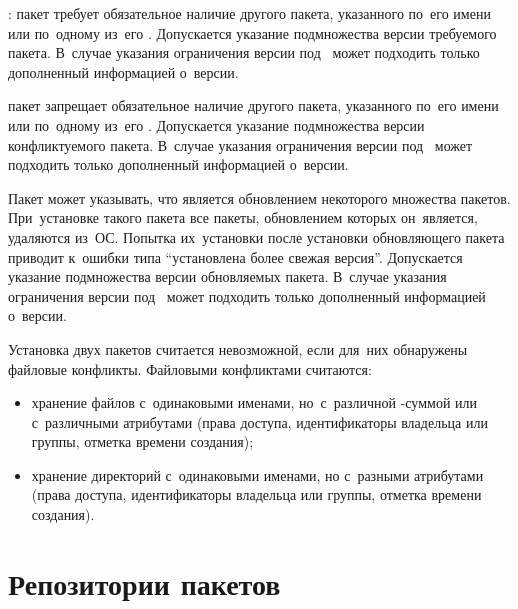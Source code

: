\begin{description}

\item{:}
пакет требует обязательное наличие другого пакета, указанного по~его имени или по~одному из~его .
Допускается указание подмножества версии требуемого пакета.
В~случае указания ограничения версии под~ может подходить  только дополненный информацией о~версии.

\item[\EN{Conflicts}:]
пакет запрещает обязательное наличие другого пакета, указанного по~его имени или по~одному из~его .
Допускается указание подмножества версии конфликтуемого пакета.
В~случае указания ограничения версии под~ может подходить  только дополненный информацией о~версии.

\item[\EN{Obsoletes}:]
Пакет может указывать, что является обновлением некоторого множества пакетов.
При~установке такого пакета все пакеты, обновлением которых он~является, удаляются из~ОС.
Попытка их~установки после установки обновляющего пакета приводит к~ошибки типа ``установлена более свежая версия''.
Допускается указание подмножества версии обновляемых пакета.
В~случае указания ограничения версии под~ может подходить  только дополненный информацией о~версии.

\end{description}

Установка двух пакетов считается невозможной, если для~них обнаружены файловые конфликты.
Файловыми конфликтами считаются:


\begin{itemize}

\item {
хранение файлов с~одинаковыми именами, но~с~различной -суммой или с~различными атрибутами 
(права доступа, идентификаторы владельца или группы, отметка времени создания);
}

\item {
хранение директорий с~одинаковыми именами, но с~разными атрибутами 
(права доступа, идентификаторы владельца или группы, отметка времени создания).
}

\end{itemize}

\section{Репозитории пакетов}

